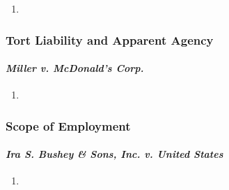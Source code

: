 \begin{enumerate}
    \item %
\end{enumerate}

\subsubsection{Tort Liability and Apparent Agency}

\paragraph{\emph{Miller v. McDonald's Corp.}}

\begin{enumerate}
    \item %
\end{enumerate}

\subsubsection{Scope of Employment}

\paragraph{\emph{Ira S. Bushey \& Sons, Inc. v. United States}}

\begin{enumerate}
    \item %
\end{enumerate}

